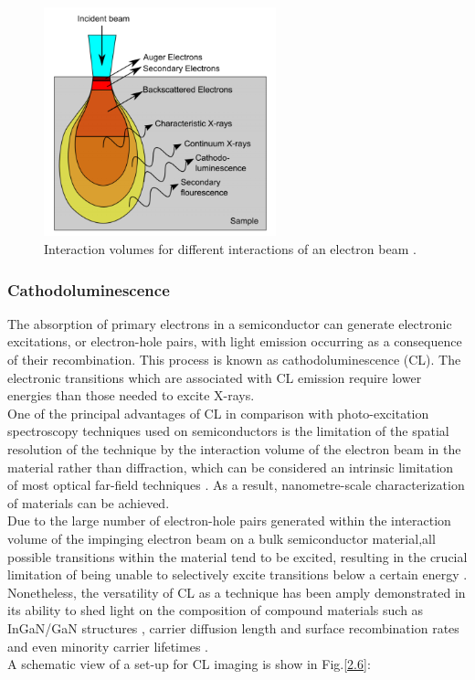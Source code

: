 \begin{figure}[h]
	\centering
	\includegraphics[width=0.6\textwidth]{Figs/Ch2/int.png}
	\caption {Interaction volumes for different interactions of an electron beam \cite{Puchtler2014}.}
	\label{2.5}
\end{figure}
\FloatBarrier



\subsubsection{Cathodoluminescence}

The absorption of primary electrons in a semiconductor can generate electronic excitations, or electron-hole pairs, with light emission occurring as a consequence of their recombination. This process is known as cathodoluminescence (CL). The electronic transitions which are associated with CL emission require lower energies than those needed to excite X-rays.\\
\indent One of the principal advantages of CL in comparison with photo-excitation spectroscopy techniques used on semiconductors is the limitation of the spatial resolution of the technique by the interaction volume of the electron beam in the material rather than diffraction, which can be considered an intrinsic limitation of most optical far-field techniques \cite{Edwards2011}. As a result, nanometre-scale characterization of materials can be achieved.\\
\indent Due to the large number of electron-hole pairs generated within the interaction volume of the impinging electron beam on a bulk semiconductor material,all possible transitions within the material tend to be excited, resulting in the crucial limitation of being unable to selectively excite transitions below a certain energy \cite{Edwards2011}. Nonetheless, the versatility of CL as a technique has been amply demonstrated in its ability to shed light on the composition of compound materials such as InGaN/GaN structures \cite{Martin2004}, carrier diffusion length and surface recombination rates \cite{Sercel1989} and even minority carrier lifetimes \cite{YacobiHolt1990}.\\
\indent A schematic view of a set-up for CL imaging is show in Fig.\ref{2.6}:

